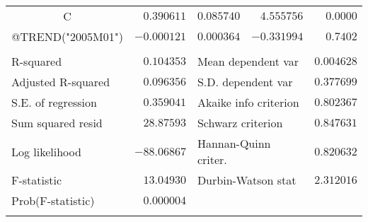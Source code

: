 \begin{tabular}{lrrrr}
\multicolumn{1}{c}{C}&\multicolumn{1}{r}{$0.390611$}&\multicolumn{1}{r}{$0.085740$}&\multicolumn{1}{r}{$4.555756$}&\multicolumn{1}{r}{$0.0000$}\\
\multicolumn{1}{c}{@TREND("2005M01")}&\multicolumn{1}{r}{$-0.000121$}&\multicolumn{1}{r}{$0.000364$}&\multicolumn{1}{r}{$-0.331994$}&\multicolumn{1}{r}{$0.7402$}\\
[4.5pt] \hline \\ [-4.5pt]
\multicolumn{1}{l}{R-squared}&\multicolumn{1}{r}{$0.104353$}&\multicolumn{2}{l}{Mean dependent var}&\multicolumn{1}{r}{$0.004628$}\\
\multicolumn{1}{l}{Adjusted R-squared}&\multicolumn{1}{r}{$0.096356$}&\multicolumn{2}{l}{S.D. dependent var}&\multicolumn{1}{r}{$0.377699$}\\
\multicolumn{1}{l}{S.E. of regression}&\multicolumn{1}{r}{$0.359041$}&\multicolumn{2}{l}{Akaike info criterion}&\multicolumn{1}{r}{$0.802367$}\\
\multicolumn{1}{l}{Sum squared resid}&\multicolumn{1}{r}{$28.87593$}&\multicolumn{2}{l}{Schwarz criterion}&\multicolumn{1}{r}{$0.847631$}\\
\multicolumn{1}{l}{Log likelihood}&\multicolumn{1}{r}{$-88.06867$}&\multicolumn{2}{l}{Hannan-Quinn criter.}&\multicolumn{1}{r}{$0.820632$}\\
\multicolumn{1}{l}{F-statistic}&\multicolumn{1}{r}{$13.04930$}&\multicolumn{2}{l}{Durbin-Watson stat}&\multicolumn{1}{r}{$2.312016$}\\
\multicolumn{1}{l}{Prob(F-statistic)}&\multicolumn{1}{r}{$0.000004$}&\multicolumn{1}{c}{}&\multicolumn{1}{c}{}&\multicolumn{1}{c}{}\\
[4.5pt] \hline \\ [-4.5pt]
\end{tabular}